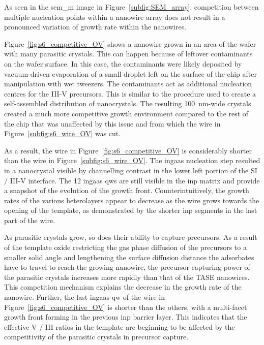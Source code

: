 As seen in the \acs{sem_m} image in Figure~\ref{subfig:SEM_array}, competition between multiple nucleation points within a nanowire array does not result in a pronounced variation of growth rate within the nanowires. 

Figure~\ref{fig:s6_competitive_OV} shows a nanowire grown in an area of the wafer with many parasitic crystals. This can happen because of leftover contaminants on the wafer surface. In this case, the contaminants were likely deposited by vacuum-driven evaporation of a small droplet left on the surface of the chip after manipulation with wet tweezers. The contaminants act as additional nucleation centres for the III-V precursors. This is similar to the procedure used to create a self-assembled distribution of nanocrystals. The resulting \qty{100}{\nano\metre}-wide crystals created a much more competitive growth environment compared to the rest of the chip that was unaffected by this issue and from which the wire in Figure~\ref{subfig:s6_wire_OV} was cut.

As a result, the wire in Figure~\ref{fig:s6_competitive_OV} is considerably shorter than the wire in Figure~\ref{subfig:s6_wire_OV}. The \acs{ingaas} nucleation step resulted in a nanocrystal visible by channelling contrast in the lower left portion of the \acs{SI} / III-V interface. The \num{12} \acs{ingaas} \acl{qw}s are still visible in the \acs{inp} matrix and provide a snapshot of the evolution of the growth front. Counterintuitively, the growth rates of the various heterolayers appear to decrease as the wire grows towards the opening of the template, as demonstrated by the shorter \acs{inp} segments in the last part of the wire. 

As parasitic crystals grow, so does their ability to capture precursors. As a result of the template oxide restricting the gas phase diffusion of the precursors to a smaller solid angle and lengthening the surface diffusion distance the adsorbates have to travel to reach the growing nanowire, the precursor capturing power of the parasitic crystals increases more rapidly than that of the \acs{TASE} nanowires. This competition mechanism explains the decrease in the growth rate of the nanowire. Further, the last \acs{ingaas} \acl{qw} of the wire in Figure~\ref{fig:s6_competitive_OV} is shorter than the others, with a multi-facet growth front forming in the previous \acs{inp} barrier layer. This indicates that the effective V / III ratios in the template are beginning to be affected by the competitivity of the parasitic crystals in precursor capture.

